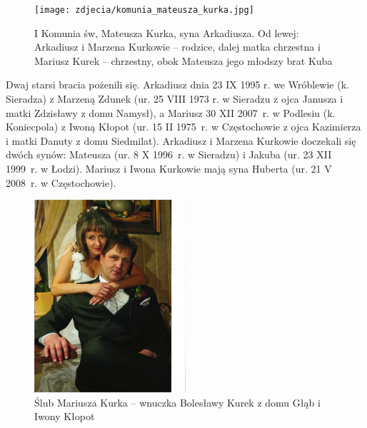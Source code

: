 \begin{figure}[!h]
\begin{center}
\texttt{[image: zdjecia/komunia\_mateusza\_kurka.jpg]}
\caption[I Komunia św, Mateusza Kurka]{I Komunia św, Mateusza Kurka, syna Arkadiusza. Od lewej: Arkadiusz i Marzena Kurkowie -- rodzice, dalej matka chrzestna i Mariusz Kurek -- chrzestny, obok Mateusza jego młodszy brat Kuba}
\label{rys:komunia_mateusza_kurka}
\end{center}
\end{figure}

Dwaj starsi bracia pożenili się. Arkadiusz dnia 23 IX 1995 r. we Wróblewie (k. Sieradza) z Marzeną Zdunek (ur. 25 VIII 1973 r. w Sieradzu z ojca Janusza i matki Zdzisławy z domu Namysł), a Mariusz 30 XII 2007~r. w Podlesiu (k. Koniecpola) z Iwoną Kłopot (ur. 15 II 1975~r. w Częstochowie z ojca Kazimierza i matki Danuty z domu Siedmilat). Arkadiusz i Marzena Kurkowie doczekali się dwóch synów: Mateusza (ur. 8 X 1996~r. w Sieradzu) i Jakuba (ur. 23 XII 1999~r. w Łodzi). Mariusz i Iwona Kurkowie mają syna Huberta (ur. 21 V 2008~r. w Częstochowie). 


\begin{figure}[!h]
\begin{center}
\includegraphics[width=0.5\textwidth]{zdjecia/mariusz_i_iwona_kurek.jpg}
\caption[Ślub Mariusza Kurka z Iwoną Kłopot]{Ślub Mariusza Kurka -- wnuczka Bolesławy Kurek z domu Głąb i Iwony Kłopot}
\label{rys:mariusz_i_iwona_kurek}
\end{center}
\end{figure}

